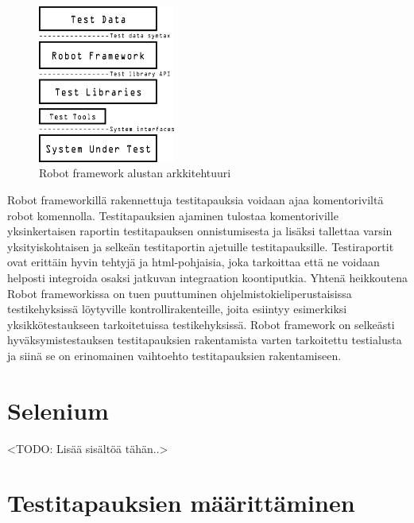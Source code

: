   \begin{figure}[H]
    \centering
    \includegraphics[width=0.4\textwidth]{assets/robot-arkkitehtuuri.png}
    \caption{Robot framework alustan arkkitehtuuri}
    \label{fig:robot-architecture}
  \end{figure}

  Robot frameworkillä rakennettuja testitapauksia voidaan ajaa komentoriviltä robot komennolla.
  Testitapauksien ajaminen tulostaa komentoriville yksinkertaisen raportin testitapauksen onnistumisesta ja lisäksi tallettaa varsin yksityiskohtaisen ja selkeän testitaportin ajetuille testitapauksille.
  Testiraportit ovat erittäin hyvin tehtyjä ja html-pohjaisia, joka tarkoittaa että ne voidaan helposti integroida osaksi jatkuvan integraation koontiputkia.
  Yhtenä heikkoutena Robot frameworkissa on tuen puuttuminen ohjelmistokieliperustaisissa testikehyksissä löytyville kontrollirakenteille, joita esiintyy esimerkiksi yksikkötestaukseen tarkoitetuissa testikehyksissä.
  Robot framework on selkeästi hyväksymistestauksen testitapauksien rakentamista varten tarkoitettu testialusta ja siinä se on erinomainen vaihtoehto testitapauksien rakentamiseen.

\section{Selenium} \label{ch:08_selenium}

  <TODO: Lisää sisältöä tähän..>

\section{Testitapauksien määrittäminen} \label{ch:08_testitapauksien_maarittaminen}

